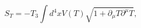 \begin{equation}\label{tact}
S_{T}=-T_{3}\int d^{4}x V(T)\sqrt{1+\partial_{\mu}T\partial^{\mu}T},
\end{equation}

